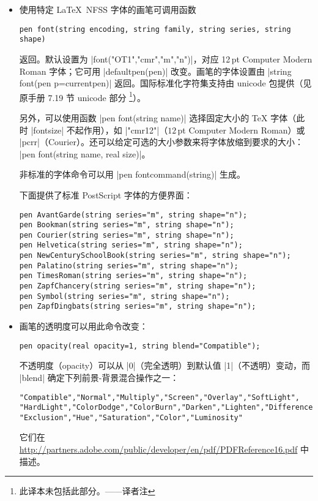 \documentclass{ctexbook}
\newcommand*\prgname[1]{\textsf{#1}}
\newcommand\transnote[1]{\footnote{#1——译者注}}
\begin{document}
\begin{itemize}
\item 使用特定 \LaTeX\ NFSS 字体的画笔可调用函数
\begin{lstlisting}
pen font(string encoding, string family, string series, string shape)
\end{lstlisting}
  返回。默认设置为 |font("OT1","cmr","m","n")|，对应 12\,pt Computer Modern
  Roman 字体；它可用 |defaultpen(pen)| 改变。画笔的字体设置由
  |string font(pen p=currentpen)| 返回。国际标准化字符集支持由
  \prgname{unicode} 包提供（见原手册 7.19 节 \prgname{unicode} 部分%
  \transnote{此译本未包括此部分。}）。

  另外，可以使用函数 |pen font(string name)| 选择固定大小的 \TeX{} 字体（此时
  |fontsize| 不起作用），如 |"cmr12"|（$12$\,pt Computer Modern Roman）或
  |pcrr|（Courier）。还可以给定可选的大小参数来将字体放缩到要求的大小：
  |pen font(string name, real size)|。

  非标准的字体命令可以用 |pen fontcommand(string)| 生成。

  \index{PostScript 字体@\prgname{PostScript} 字体}
  下面提供了标准 \prgname{PostScript} 字体的方便界面：
\begin{lstlisting}
pen AvantGarde(string series="m", string shape="n");
pen Bookman(string series="m", string shape="n");
pen Courier(string series="m", string shape="n");
pen Helvetica(string series="m", string shape="n");
pen NewCenturySchoolBook(string series="m", string shape="n");
pen Palatino(string series="m", string shape="n");
pen TimesRoman(string series="m", string shape="n");
pen ZapfChancery(string series="m", string shape="n");
pen Symbol(string series="m", string shape="n");
pen ZapfDingbats(string series="m", string shape="n");
\end{lstlisting}

\item 画笔的透明度可以用此命令改变：
\begin{lstlisting}
pen opacity(real opacity=1, string blend="Compatible");
\end{lstlisting}
  不透明度（opacity）可以从 |0|（完全透明）到默认值 |1|（不透明）变动，而
  |blend| 确定下列前景-背景混合操作之一：
\begin{lstlisting}
"Compatible","Normal","Multiply","Screen","Overlay","SoftLight",
"HardLight","ColorDodge","ColorBurn","Darken","Lighten","Difference",
"Exclusion","Hue","Saturation","Color","Luminosity"
\end{lstlisting}
  它们在
\url{http://partners.adobe.com/public/developer/en/pdf/PDFReference16.pdf}
  中描述。


\end{itemize}
\end{document}
